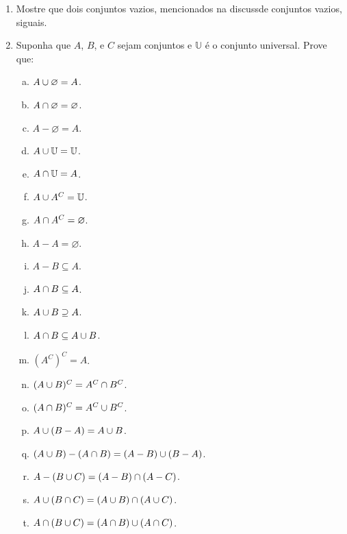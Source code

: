 \begin{enumerate}[{\bf 1.}]
\item Mostre que dois conjuntos vazios, mencionados na discuss\ao de conjuntos vazios, s\ao iguais.

\item \label{conjuntos5}Suponha que $A$, $B$, e $C$ sejam conjuntos e $\mathbb{U}$ \'e o conjunto universal. Prove que:
\begin{enumerate}[a)]
\item $A\cup\varnothing=A$.
\item $A\cap\varnothing=\varnothing$.
\item $A-\varnothing=A$.
\item $A\cup\mathbb{U}=\mathbb{U}$.
\item $A\cap\mathbb{U}=A$.
\item $A\cup A^C=\mathbb{U}$.
\item $A\cap A^C=\varnothing$.
\item $A-A=\varnothing$.
\item $A-B\subseteq A$.
\item $A\cap B \subseteq A$.
\item $A\cup B \supseteq A$.
\item $A\cap B\subseteq A\cup B$.
\item $(A^C)^C=A$.
\item $(A\cup B)^C = A^C\cap B^C$.
\item $(A\cap B)^C = A^C\cup B^C$.
\item $A\cup(B-A)=A\cup B$.
\item $(A\cup B)-(A\cap B)=(A-B)\cup(B-A)$.
\item $A-(B\cup C)=(A-B)\cap(A-C)$.
\item $A\cup(B\cap C)=(A\cup B)\cap(A\cup C)$.
\item $A\cap(B\cup C)=(A\cap B)\cup(A\cap C)$.
\end{enumerate}


\end{enumerate}
